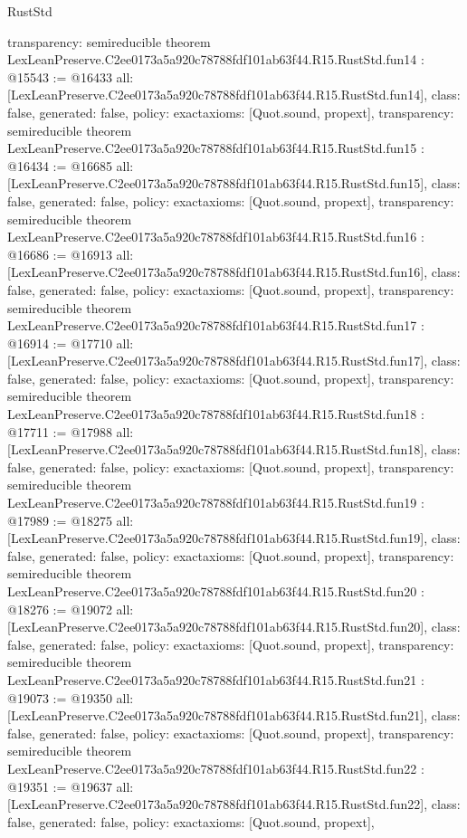 \begin{lexlean}{RustStd}
\begin{coremodule}
{  transparency: semireducible
}
theorem LexLeanPreserve.C2ee0173a5a920c78788fdf101ab63f44.R15.RustStd.fun14 : @15543 := @16433 {
  all: [LexLeanPreserve.C2ee0173a5a920c78788fdf101ab63f44.R15.RustStd.fun14],
  class: false,
  generated: false,
  policy: exact{axioms: [Quot.sound, propext]},
  transparency: semireducible
}
theorem LexLeanPreserve.C2ee0173a5a920c78788fdf101ab63f44.R15.RustStd.fun15 : @16434 := @16685 {
  all: [LexLeanPreserve.C2ee0173a5a920c78788fdf101ab63f44.R15.RustStd.fun15],
  class: false,
  generated: false,
  policy: exact{axioms: [Quot.sound, propext]},
  transparency: semireducible
}
theorem LexLeanPreserve.C2ee0173a5a920c78788fdf101ab63f44.R15.RustStd.fun16 : @16686 := @16913 {
  all: [LexLeanPreserve.C2ee0173a5a920c78788fdf101ab63f44.R15.RustStd.fun16],
  class: false,
  generated: false,
  policy: exact{axioms: [Quot.sound, propext]},
  transparency: semireducible
}
theorem LexLeanPreserve.C2ee0173a5a920c78788fdf101ab63f44.R15.RustStd.fun17 : @16914 := @17710 {
  all: [LexLeanPreserve.C2ee0173a5a920c78788fdf101ab63f44.R15.RustStd.fun17],
  class: false,
  generated: false,
  policy: exact{axioms: [Quot.sound, propext]},
  transparency: semireducible
}
theorem LexLeanPreserve.C2ee0173a5a920c78788fdf101ab63f44.R15.RustStd.fun18 : @17711 := @17988 {
  all: [LexLeanPreserve.C2ee0173a5a920c78788fdf101ab63f44.R15.RustStd.fun18],
  class: false,
  generated: false,
  policy: exact{axioms: [Quot.sound, propext]},
  transparency: semireducible
}
theorem LexLeanPreserve.C2ee0173a5a920c78788fdf101ab63f44.R15.RustStd.fun19 : @17989 := @18275 {
  all: [LexLeanPreserve.C2ee0173a5a920c78788fdf101ab63f44.R15.RustStd.fun19],
  class: false,
  generated: false,
  policy: exact{axioms: [Quot.sound, propext]},
  transparency: semireducible
}
theorem LexLeanPreserve.C2ee0173a5a920c78788fdf101ab63f44.R15.RustStd.fun20 : @18276 := @19072 {
  all: [LexLeanPreserve.C2ee0173a5a920c78788fdf101ab63f44.R15.RustStd.fun20],
  class: false,
  generated: false,
  policy: exact{axioms: [Quot.sound, propext]},
  transparency: semireducible
}
theorem LexLeanPreserve.C2ee0173a5a920c78788fdf101ab63f44.R15.RustStd.fun21 : @19073 := @19350 {
  all: [LexLeanPreserve.C2ee0173a5a920c78788fdf101ab63f44.R15.RustStd.fun21],
  class: false,
  generated: false,
  policy: exact{axioms: [Quot.sound, propext]},
  transparency: semireducible
}
theorem LexLeanPreserve.C2ee0173a5a920c78788fdf101ab63f44.R15.RustStd.fun22 : @19351 := @19637 {
  all: [LexLeanPreserve.C2ee0173a5a920c78788fdf101ab63f44.R15.RustStd.fun22],
  class: false,
  generated: false,
  policy: exact{axioms: [Quot.sound, propext]},
}
\end{coremodule}
\end{lexlean}
